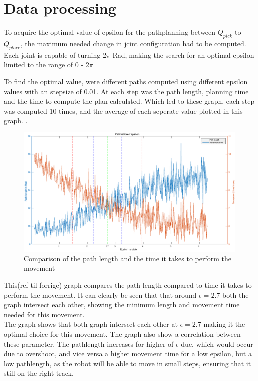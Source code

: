 \documentclass[11pt]{article}
\begin{document}
\section{Data processing}
To acquire the optimal value of epsilon for the pathplanning between $Q_{pick}$ to $Q_{place}$,  the maximum needed change in joint configuration had to be computed. Each joint is capable of turning 2$\pi$ Rad, making the search for an optimal epsilon limited to the range of 0 - 2$\pi$
 
 
\noindent To find the optimal value, were different paths computed using different epsilon values with an stepsize of 0.01.  At each step was the path length, planning time  and the time to compute the plan calculated.   Which led to these graph, each step was computed 10 times, and the average of each seperate value plotted in this graph. .\\[0.2cm]

\begin{figure}[H]
\hspace{-3.5cm}\includegraphics[scale=0.55]{img/graph.eps}
\caption{Comparison of the path length and the time it takes to perform the movement}
\label{fig::graph}
\end{figure}

\noindent This(ref til forrige) graph compares the path length compared to time it takes to perform the movement.  It can clearly be seen that  that around $\epsilon = 2.7$  both the graph intersect each other, showing the minimum length and movement time needed for this movement. 
\\

The graph shows that both graph intersect each other at $\epsilon = 2.7$ making it the optimal choice for this movement.  The graph also show a correlation between these parameter.  The pathlength increases for higher of $\epsilon$ due, which would occur due to overshoot, and vice versa a higher movement time for a low epsilon, but a low pathlength, as the robot will be able to move in small steps, ensuring that it still on the right track. 
\end{document}
